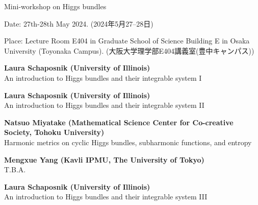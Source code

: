 \documentclass[dvipdfmx,a4paper,12pt]{article}
\theoremstyle{plain} %
\theoremstyle{definition} %
\begin{document}
\begin{center}
  {\Huge Mini-workshop on Higgs bundles}
 

  \end{center}
  
\vskip5mm
\begin{flushleft}
{ Date: 27th-28th May 2024. (2024年5月27--28日)}


{Place: Lecture Room E404 in Graduate School of Science Building E in Osaka University (Toyonaka Campus).}
{(大阪大学理学部E404講義室(豊中キャンパス))}

\end{flushleft}




\vskip3mm

\vskip3mm
\vskip1mm
{\bf Laura Schaposnik (University of Illinois)}\\
\hspace{11pt} An introduction to Higgs bundles and their integrable system I

{\bf Laura Schaposnik (University of Illinois)}\\
\hspace{11pt} An introduction to Higgs bundles and their integrable system II

{\bf Natsuo Miyatake (Mathematical Science Center for Co-creative Society, Tohoku University)}\\
\hspace{11pt} Harmonic metrics on cyclic Higgs bundles, subharmonic functions, and entropy

{\bf Mengxue Yang (Kavli IPMU, The University of Tokyo)}\\
\hspace{11pt} T.B.A.

\vskip1mm
{\bf Laura Schaposnik (University of Illinois)}\\
\hspace{11pt} An introduction to Higgs bundles and their integrable system III
\end{document}
